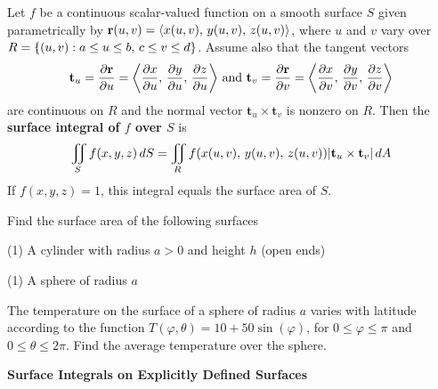 \documentclass[mathNotesPreamble]{subfiles}
\begin{document}
  \begin{defn*}
    Let $f$ be a continuous scalar-valued function on a smooth surface $S$ given parametrically by ${\mathbf{r}}(u,v)={\left\langle x(u,v),\,y(u,v),\,z(u,v) \right\rangle}$, where $u$ and $v$ vary over \newline$R={\left\{(u,v): a\leq u\leq b,\, c\leq v\leq d\right\}}$. Assume also that the tangent vectors \newline
      \[\displaystyle \mathbf t_u=\frac{\partial {\mathbf{r}}}{\partial u}={\left\langle \frac{\partial x}{\partial u},\, \frac{\partial y}{\partial u},\, \frac{\partial z}{\partial u} \right\rangle}
      \textnormal{ and }
      \displaystyle\mathbf t_v=\frac{\partial {\mathbf{r}}}{\partial v}={\left\langle \frac{\partial x}{\partial v},\, \frac{\partial y}{\partial v},\, \frac{\partial z}{\partial v} \right\rangle}\]
    are continuous on $R$ and the normal vector $\mathbf t_u\times\mathbf t_v$ is nonzero on $R$. Then the \textbf{surface integral of $f$ over $S$} is 
      \[\iint\limits_S f(x,y,z)\,dS = \iint\limits_R f{\left(x(u,v),\,y(u,v),\,z(u,v)\right)}{\left\vert\mathbf t_u\times\mathbf t_v\right\vert}\,dA\]
    If $f(x,y,z)=1$, this integral equals the surface area of $S$.
  \end{defn*}
  \begin{ex*}
    Find the surface area of the following surfaces
  \end{ex*}
  \begin{tasks}[after-item-skip=\stretch{1}, label=](1)
    \task A cylinder with radius $a>0$ and height $h$ (open ends)
  \end{tasks}
  \pagebreak

  \begin{tasks}[after-item-skip=\stretch{1}, label=, resume](1)
    \task A sphere of radius $a$
  \end{tasks}
  \pagebreak

  \begin{ex*}
    The temperature on the surface of a sphere of radius $a$ varies with latitude according to the function $T(\varphi, \theta)=10+50\sin(\varphi)$, for $0\leq \varphi\leq \pi$ and $0\leq \theta\leq 2\pi$. Find the average temperature over the sphere.
  \end{ex*}
  \pagebreak

  \noindent
  \textbf{Surface Integrals on Explicitly Defined Surfaces}
\end{document}
